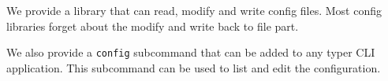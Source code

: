 We provide a library that can read, modify and write config files.
Most config libraries forget about the modify and write back to file part.

We also provide a \texttt{config} subcommand that can be added to any typer CLI 
application.
This subcommand can be used to list and edit the configuration.
